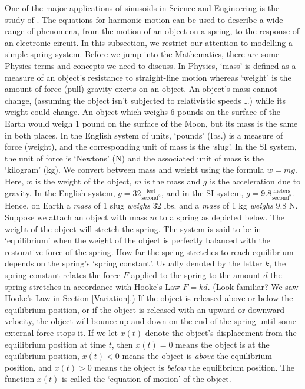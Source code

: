 One of the major applications of sinusoids in Science and Engineering is the study of  .   The equations for harmonic motion can be used to describe a wide range of phenomena, from the motion of an object on a spring, to the response of an electronic circuit.  In this subsection, we restrict our attention to modelling a simple spring system.  Before we jump into the Mathematics, there are some Physics terms and concepts we need to discuss.  In Physics, `mass' is defined as a measure of an object's resistance to straight-line motion whereas `weight' is the amount of force (pull) gravity exerts on an object.  An object's mass cannot change, (assuming the object isn't subjected to relativistic speeds \dots) while its weight could change.  An object which weighs 6 pounds on the surface of the Earth would weigh 1 pound on the surface of the Moon, but its mass is the same in both places. In the English system of units, `pounds' (lbs.) is a measure of force (weight), and the corresponding unit of mass is the `slug'. In the SI system, the unit of force is `Newtons' (N) and the associated unit of mass is the `kilogram' (kg). We convert between mass and weight using the formula $w = mg$.   Here, $w$ is the weight of the object, $m$ is the mass and $g$ is the acceleration due to gravity.  In the English system, $g = 32 \frac{\text{feet}}{\text{second}^2}$, and in the SI system, $g = 9.8\frac{\text{meters}}{\text{second}^2}$. Hence, on Earth a \textit{mass} of 1 slug \textit{weighs} 32 lbs. and a \textit{mass} of 1 kg \textit{weighs} 9.8 N.   Suppose we attach an object with mass $m$ to a spring as depicted below. The weight of the object will stretch the spring.   The system is said to be in `equilibrium' when the weight of the object is perfectly balanced with the restorative force of the spring.  How far the spring stretches to reach equilibrium depends on the spring's `spring constant'. Usually denoted by the letter $k$, the spring constant relates the force $F$ applied to the spring to the amount $d$ the spring stretches in accordance with \href{http://en.wikipedia.org/wiki/Hooke's_law}{\underline{Hooke's Law}} $F = kd$. (Look familiar?  We saw Hooke's Law in Section \ref{Variation}.) If the object is released above or below the equilibrium position, or if the object is released with an upward or downward velocity, the object will bounce up and down on the end of the spring until some external force stops it.  If we let $x(t)$ denote the object's displacement from the equilibrium position at time $t$, then $x(t) = 0$ means the object is at the equilibrium position, $x(t) < 0$ means the object is \textit{above} the equilibrium position, and $x(t) > 0$ means the object is \textit{below} the equilibrium position.  The function $x(t)$ is called the `equation of motion' of the object.



